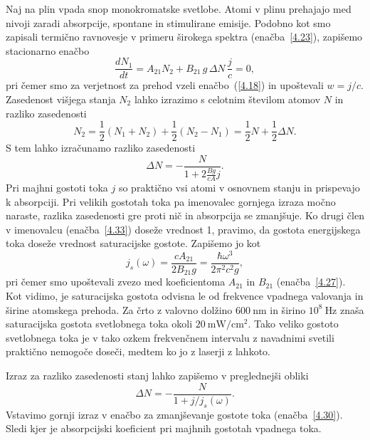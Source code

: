 Naj na plin vpada snop monokromatske svetlobe. 
Atomi v plinu prehajajo med nivoji zaradi absorpcije, spontane in stimulirane emisije. 
Podobno kot smo zapisali termično ravnovesje v primeru
širokega spektra (enačba~\ref{4.23}), zapišemo stacionarno enačbo 
\begin{equation}
\frac{dN_{1}}{dt}=A_{21}N_{2}+B_{21}\,g\,\Delta N\,\frac{j}{c}=0,
\label{4.32}
\end{equation}
pri čemer smo za verjetnost za prehod vzeli
enačbo~(\ref{4.18}) in upoštevali $w=j/c$. Zasedenost višjega stanja $N_{2}$ lahko izrazimo s 
celotnim številom atomov $N$ in razliko zasedenosti 
\begin{equation}
N_{2}=\frac{1}{2}(N_1+N_2) + \frac{1}{2}(N_2-N_1) = \frac{1}{2}N+\frac{1}{2}\Delta N.
\label{4.321}
\end{equation}
S tem lahko izračunamo razliko zasedenosti 
\begin{equation}
\Delta N=-\frac{N}{1+2\frac{Bg}{cA}j}.
\label{4.33}
\end{equation}
Pri majhni gostoti toka $j$ so praktično vsi atomi v osnovnem stanju in prispevajo
k absorpciji. Pri velikih gostotah toka pa imenovalec gornjega
izraza močno naraste, razlika zasedenosti gre proti nič in absorpcija se zmanjšuje.
Ko drugi člen v imenovalcu (enačba~\ref{4.33}) doseže vrednost 1, pravimo, da
gostota energijskega toka doseže vrednost saturacijske gostote.
Zapišemo jo kot 
\begin{equation}
j_{s}(\omega)=\frac{cA_{21}}{2B_{21}g}=
\frac{\hbar\omega^{3}}{2\pi^{2}c^{2}g},
\label{4.34}
\end{equation}
pri čemer smo upoštevali zvezo med koeficientoma $A_{21}$ in $B_{21}$
(enačba~\ref{4.27}).
Kot vidimo, je saturacijska gostota odvisna le od frekvence vpadnega valovanja 
in širine atomskega prehoda. Za črto z valovno dolžino $600~\si{\nano\metre}$ 
in širino $10^{8}~\si{\hertz}$ znaša saturacijska gostota svetlobnega toka okoli 
$20~\si{\milli\watt/\centi\metre^2}$. Tako veliko gostoto svetlobnega toka je v tako ozkem
frekvenčnem intervalu z navadnimi svetili praktično nemogoče doseči, 
medtem ko jo z laserji z lahkoto.

Izraz za razliko zasedenosti stanj lahko zapišemo v preglednejši obliki
\begin{equation}
\Delta N=-\frac{N}{1+j/j_{s}(\omega)}.
\label{4.35}
\end{equation}
Vstavimo gornji izraz v enačbo za zmanjševanje gostote toka (enačba~\ref{4.30}). Sledi
kjer je 
absorpcijski koeficient pri majhnih gostotah vpadnega toka.

